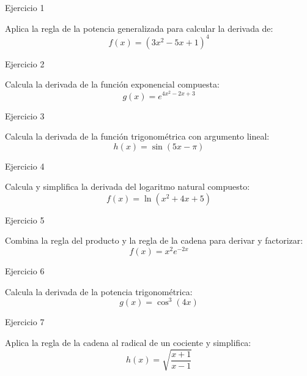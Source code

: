 \documentclass[aspectratio=169]{beamer}
\begin{document}
\begin{frame}{Ejercicio 1}
  \begin{mwejercicio}
    Aplica la regla de la potencia generalizada para calcular la derivada de:
    $$f(x) = (3x^2 - 5x + 1)^4$$
  \end{mwejercicio}
  \vspace{3.5cm}
\end{frame}
\begin{frame}{Ejercicio 2}
  \begin{mwejercicio}
    Calcula la derivada de la función exponencial compuesta:
    $$g(x) = e^{4x^2 - 2x + 3}$$
  \end{mwejercicio}
  \vspace{3.5cm}
\end{frame}
\begin{frame}{Ejercicio 3}
  \begin{mwejercicio}
    Calcula la derivada de la función trigonométrica con argumento lineal:
    $$h(x) = \sin(5x - \pi)$$
  \end{mwejercicio}
  \vspace{3.5cm}
\end{frame}
\begin{frame}{Ejercicio 4}
  \begin{mwejercicio}
    Calcula y simplifica la derivada del logaritmo natural compuesto:
    $$f(x) = \ln(x^2 + 4x + 5)$$
  \end{mwejercicio}
  \vspace{3.5cm}
\end{frame}
\begin{frame}{Ejercicio 5}
  \begin{mwejercicio}
    Combina la regla del producto y la regla de la cadena para derivar y factorizar:
    $$f(x) = x^2 e^{-2x}$$
  \end{mwejercicio}
  \vspace{3.5cm}
\end{frame}
\begin{frame}{Ejercicio 6}
  \begin{mwejercicio}
    Calcula la derivada de la potencia trigonométrica:
    $$g(x) = \cos^3(4x)$$
  \end{mwejercicio}
  \vspace{3.5cm}
\end{frame}
\begin{frame}{Ejercicio 7}
  \begin{mwejercicio}
    Aplica la regla de la cadena al radical de un cociente y simplifica:
    $$h(x) = \sqrt{\frac{x + 1}{x - 1}}$$
  \end{mwejercicio}
  \vspace{3.5cm}
\end{frame}
\end{document}
